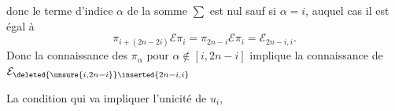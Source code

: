 donc le terme d'indice $\alpha$ de la somme $\sum$ est nul sauf si $\alpha=i$, auquel cas il est égal à
\[
\pi_{i+(2n-2i)}\mathcal E\pi_i=\pi_{2n-i}\mathcal E\pi_i=\mathcal E_{2n-i,i}.
\]
Donc la connaissance des $\pi_\alpha$ pour $\alpha\notin[i,2n-i]$ implique la connaissance de $\mathcal E_{\deleted{\unsure{i,2n-i}}\inserted{2n-i,i}}$ 

La condition qui va impliquer l'unicité  de $u_i$,
